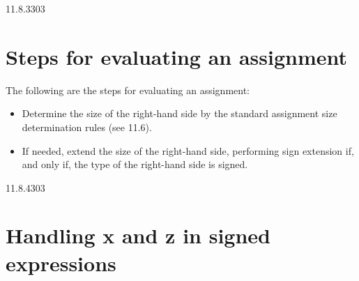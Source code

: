 \documentclass{article}
\newcommand{\del}{\color{darkred}}
\begin{document}
\begin{lrmquote}{11.8.3}{303}
  {
    \del{}

    \section{Steps for evaluating an assignment}

    The following are the steps for evaluating an assignment:
    \begin{itemize}
      \item Determine the size of the right-hand side by the standard assignment
        size determination rules (see 11.6).
      \item If needed, extend the size of the right-hand side, performing sign
        extension if, and only if, the type of the right-hand side is signed.
    \end{itemize}
  }
\end{lrmquote}
\begin{lrmquote}{11.8.4}{303}
  \section{Handling x and z in signed expressions}

  \textelp{}
\end{lrmquote}


\appendix
\end{document}
